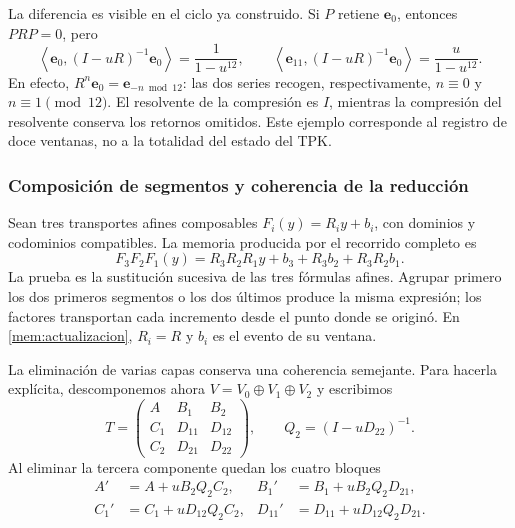 La diferencia es visible en el ciclo ya construido. Si \(P\) retiene
\(\mathbf e_0\), entonces \(PRP=0\), pero
\begin{equation}
 \left\langle\mathbf e_0,(I-uR)^{-1}\mathbf e_0\right\rangle
 =\frac1{1-u^{12}},\qquad
 \left\langle\mathbf e_{11},(I-uR)^{-1}\mathbf e_0\right\rangle
 =\frac u{1-u^{12}}.
 \label{mem:ejemplo-ciclo}
\end{equation}
En efecto, \(R^n\mathbf e_0=\mathbf e_{-n\bmod12}\): las
dos series recogen, respectivamente, \(n\equiv0\) y
\(n\equiv1\pmod{12}\). El resolvente de la compresión es \(I\),
mientras la compresión del resolvente conserva los retornos omitidos.
Este ejemplo corresponde al registro de doce ventanas, no a la totalidad
del estado del TPK.

\subsubsection{Composición de segmentos y coherencia de la reducción}

Sean tres transportes afines composables
\(F_i(y)=R_i y+b_i\), con dominios y codominios compatibles.
La memoria producida por el recorrido completo es
\begin{equation}
 F_3F_2F_1(y)
 =R_3R_2R_1y+b_3+R_3b_2+R_3R_2b_1.
 \label{mem:cociclo-tres}
\end{equation}
La prueba es la sustitución sucesiva de las tres fórmulas afines.
Agrupar primero los dos primeros segmentos o los dos últimos produce
la misma expresión; los factores transportan cada incremento desde
el punto donde se originó. En \eqref{mem:actualizacion},
\(R_i=R\) y \(b_i\) es el evento de su ventana.

La eliminación de varias capas conserva una coherencia semejante.
Para hacerla explícita, descomponemos ahora
\(V=V_0\oplus V_1\oplus V_2\) y escribimos
\[
 T=\begin{pmatrix}
 A&B_1&B_2\\C_1&D_{11}&D_{12}\\C_2&D_{21}&D_{22}
 \end{pmatrix},\qquad Q_2=(I-uD_{22})^{-1}.
\]
Al eliminar la tercera componente quedan los cuatro bloques
\begin{equation}
 \begin{aligned}
 A'&=A+uB_2Q_2C_2,&
 B_1'&=B_1+uB_2Q_2D_{21},\\
 C_1'&=C_1+uD_{12}Q_2C_2,&
 D_{11}'&=D_{11}+uD_{12}Q_2D_{21}.
 \end{aligned}
 \label{mem:schur-intermedio}
\end{equation}

